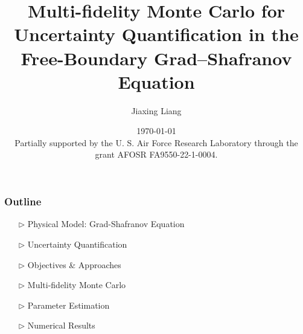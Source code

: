 \documentclass{beamer}
\title[MFMC for Tokamak UQ]{Multi-fidelity Monte Carlo for Uncertainty Quantification in the Free-Boundary Grad–Shafranov Equation}
\date{\today\\[2em]
{\footnotesize Partially supported by the U. S. Air Force Research Laboratory through the grant AFOSR FA9550-22-1-0004. }
}
\author[J.Liang]{\normalsize  Jiaxing Liang\\ }
\institute[Rice University]{\fontsize{8}{8} Department of Computational Applied Mathematics \& Operations Research, Rice University}
\begin{document}
\frame{\titlepage }

\begin{frame}[c]		
\frametitle{Outline}
\normalsize
\begin{itemize}[leftmargin=5pt] 
\item[$\triangleright$] Physical Model: Grad-Shafranov Equation
\vspace{0.3cm}
\item[$\triangleright$] Uncertainty Quantification 
\vspace{0.3cm}
\item[$\triangleright$] Objectives \& Approaches
\vspace{0.3cm}
\item[$\triangleright$] Multi-fidelity Monte Carlo
\vspace{0.3cm}
\item[$\triangleright$] Parameter Estimation
\vspace{0.3cm}
\item[$\triangleright$] Numerical Results
\end{itemize}
\end{frame}
\end{document}
